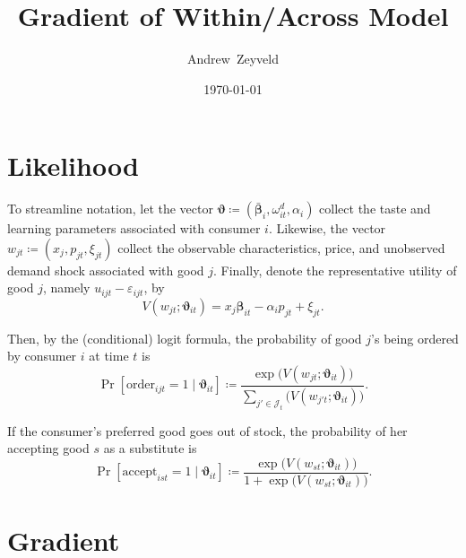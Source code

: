 \documentclass[12pt]{article}
\theoremstyle{plain}
\begin{document}
\title{Gradient of Within/Across Model}
\author{Andrew~Zeyveld}
\date{\today}
\maketitle
\onehalfspacing


\section{Likelihood}

To streamline notation, let the vector \(\bm{\vartheta} \coloneq ( \bar{\bm{\beta}}_i, \omega_{it}^d, \alpha_i) \) collect the taste and learning parameters associated with consumer \(i\). Likewise, the vector \(w_{jt} \coloneq (x_j, p_{jt}, \xi_{jt})\) collect the observable characteristics, price, and unobserved demand shock associated with good \(j\). Finally, denote the representative utility of good \(j\), namely \(u_{ijt} - \varepsilon_{ijt}\), by 
\begin{equation*}
  V(w_{jt}; \bm{\vartheta}_{it}) = x_j \bm{\beta}_{it} - \alpha_i p_{jt} + \xi_{jt}.
\end{equation*}

Then, by the (conditional) logit formula, the probability of good \(j\)'s being ordered by consumer \(i\) at time \(t\) is 
\begin{equation*}
  \operatorname{Pr} [ \text{order}_{ijt} = 1 \mid  \bm{\vartheta}_{it} ] \coloneq \frac{\exp \big(  V(w_{jt}; \bm{\vartheta}_{it}) \big)}{\sum_{j' \in \mathcal{J}_t} \big(  V(w_{j't}; \bm{\vartheta}_{it}) \big)}.
\end{equation*}

If the consumer's preferred good goes out of stock, the probability of her accepting good \(s\) as a substitute is 
\begin{equation*}
  \operatorname{Pr} [ \text{accept}_{ist} = 1 \mid \bm{\vartheta}_{it} ] \coloneq \frac{\exp \big(  V(w_{st}; \bm{\vartheta}_{it}) \big)}{1 + \exp \big(  V(w_{st}; \bm{\vartheta}_{it}) \big)}.
\end{equation*}


\section{Gradient}
\end{document}
